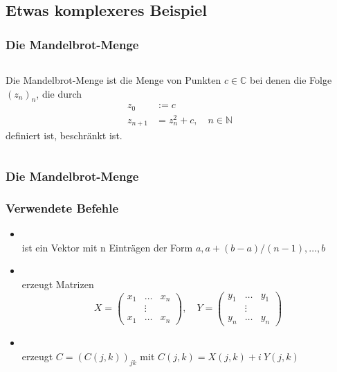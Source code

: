 \documentclass[hyperref={xetex}]{beamer}
\begin{document}
\subsection{Etwas komplexeres Beispiel}
\begin{frame}[fragile]\frametitle{Die Mandelbrot-Menge}
\begin{columns}[c,onlytextwidth]
Die Mandelbrot-Menge ist die Menge von Punkten $c \in \mathbb{C}$
bei denen die Folge $(z_n)_n$, die durch
\begin{align*} 
z_0&:=c\\
z_{n+1} &= z_n^2 +c, \quad n \in \mathbb{N} 
\end{align*}
definiert ist, beschränkt ist.
\end{columns}
\end{frame}
\begin{frame}[fragile]\frametitle{Die Mandelbrot-Menge}

\end{frame}
\begin{frame}[fragile]\frametitle{Verwendete Befehle}
\begin{itemize}
\item {}\\ ist ein Vektor mit n Einträgen der Form
$a, a+(b-a)/(n-1), \dots ,b$
\item {}\\ erzeugt Matrizen 
\begin{equation*}
X = \left( \begin{array}{ccc} x_1 & \ldots & x_n\\  & \vdots & \\x_1 & \ldots & x_n\end{array}
\right), \quad  Y = \left( \begin{array}{ccc} y_1 & \ldots & y_1\\  & \vdots & \\y_n & \ldots & y_n\end{array}  \right)
\end{equation*}
\item {}\\ erzeugt $C=(C(j,k))_{jk}$ mit
$C(j,k)=X(j,k)+i \ Y(j,k)$ 
\end{itemize}
\end{frame}
\end{document}
